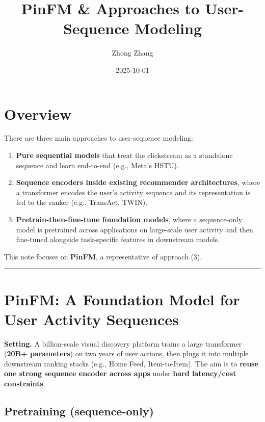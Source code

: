 \documentclass[
  letterpaper,
  DIV=11,
  numbers=noendperiod]{scrartcl}
\title{PinFM \& Approaches to User-Sequence Modeling}
\author{Zhong Zhang}
\date{2025-10-01}
\providecommand{\tightlist}{%
  \setlength{\itemsep}{0pt}\setlength{\parskip}{0pt}}
\begin{document}
\maketitle


\section{Overview}\label{overview}

There are three main approaches to user-sequence modeling:

\begin{enumerate}
\def\labelenumi{\arabic{enumi}.}
\tightlist
\item
  \textbf{Pure sequential models} that treat the clickstream as a
  standalone sequence and learn end-to-end (e.g., Meta's HSTU).
\item
  \textbf{Sequence encoders inside existing recommender architectures},
  where a transformer encodes the user's activity sequence and its
  representation is fed to the ranker (e.g., TransAct, TWIN).
\item
  \textbf{Pretrain-then-fine-tune foundation models}, where a
  sequence-only model is pretrained across applications on large-scale
  user activity and then fine-tuned alongside task-specific features in
  downstream models.
\end{enumerate}

This note focuses on \textbf{PinFM}, a representative of approach (3).

\begin{center}\rule{0.5\linewidth}{0.5pt}\end{center}

\section{PinFM: A Foundation Model for User Activity
Sequences}\label{pinfm-a-foundation-model-for-user-activity-sequences}

\textbf{Setting.} A billion-scale visual discovery platform trains a
large transformer (\textbf{20B+ parameters}) on two years of user
actions, then plugs it into multiple downstream ranking stacks (e.g.,
Home Feed, Item-to-Item). The aim is to \textbf{reuse one strong
sequence encoder across apps} under \textbf{hard latency/cost
constraints}.

\subsection{Pretraining
(sequence-only)}\label{pretraining-sequence-only}
\end{document}
